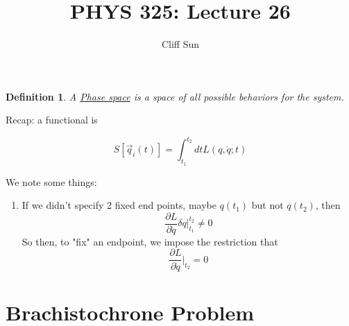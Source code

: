 \documentclass{article}
\title{PHYS 325: Lecture 26}
\author{Cliff Sun}
\newtheorem{definition}[theorem]{Definition}
\newtheorem{one minute paper}[theorem]{One Minute Paper}
\begin{document}
\maketitle

\begin{definition}
    A \underline{Phase space} is a space of all possible behaviors for the system. 
\end{definition}

Recap: a functional is 

\begin{equation}
    S[\vec{q}_i(t)] = \int_{t_1}^{t_2}dt L(q, \dot{q}; t)
\end{equation}

We note some things:

\begin{enumerate}
    \item If we didn't specify 2 fixed end points, maybe $q(t_1)$ but not $q(t_2)$, then 
    \begin{equation}
    \frac{\partial L}{\partial \dot{q}} \delta q \bigg|_{t_1}^{t_2} \neq 0
    \end{equation}
    So then, to "fix" an endpoint, we impose the restriction that 
    \begin{equation}
        \frac{\partial L}{\partial \dot{q}}\bigg|_{t_2} = 0
    \end{equation}
\end{enumerate}

\section*{Brachistochrone Problem}
\end{document}
